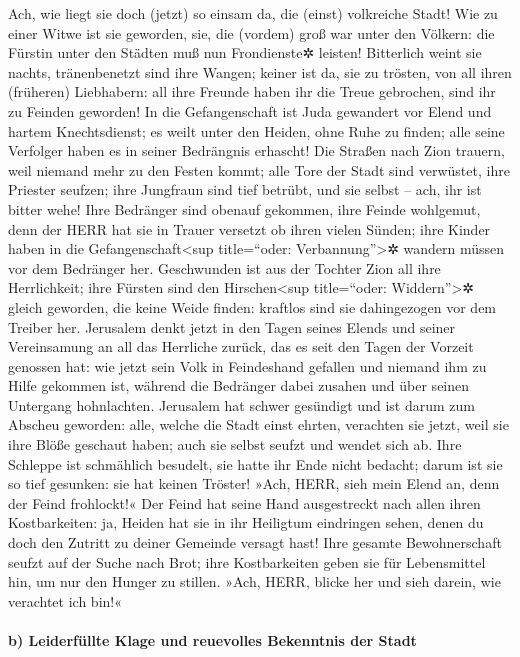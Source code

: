 Ach, wie liegt sie doch (jetzt) so einsam da, die (einst)
volkreiche Stadt! Wie zu einer Witwe ist sie geworden, sie, die (vordem)
groß war unter den Völkern: die Fürstin unter den Städten muß nun
Frondienste✲ leisten! Bitterlich weint sie nachts,
tränenbenetzt sind ihre Wangen; keiner ist da, sie zu trösten, von all
ihren (früheren) Liebhabern: all ihre Freunde haben ihr die Treue
gebrochen, sind ihr zu Feinden geworden! In die
Gefangenschaft ist Juda gewandert vor Elend und hartem Knechtsdienst; es
weilt unter den Heiden, ohne Ruhe zu finden; alle seine Verfolger haben
es in seiner Bedrängnis erhascht! Die Straßen nach Zion
trauern, weil niemand mehr zu den Festen kommt; alle Tore der Stadt sind
verwüstet, ihre Priester seufzen; ihre Jungfraun sind tief betrübt, und
sie selbst -- ach, ihr ist bitter wehe! Ihre Bedränger
sind obenauf gekommen, ihre Feinde wohlgemut, denn der HERR hat sie in
Trauer versetzt ob ihren vielen Sünden; ihre Kinder haben in die
Gefangenschaft\textless sup title=``oder: Verbannung''\textgreater✲
wandern müssen vor dem Bedränger her. Geschwunden ist aus
der Tochter Zion all ihre Herrlichkeit; ihre Fürsten sind den
Hirschen\textless sup title=``oder: Widdern''\textgreater✲ gleich
geworden, die keine Weide finden: kraftlos sind sie dahingezogen vor dem
Treiber her. Jerusalem denkt jetzt in den Tagen seines
Elends und seiner Vereinsamung an all das Herrliche zurück, das es seit
den Tagen der Vorzeit genossen hat: wie jetzt sein Volk in Feindeshand
gefallen und niemand ihm zu Hilfe gekommen ist, während die Bedränger
dabei zusahen und über seinen Untergang hohnlachten.
Jerusalem hat schwer gesündigt und ist darum zum Abscheu
geworden: alle, welche die Stadt einst ehrten, verachten sie jetzt, weil
sie ihre Blöße geschaut haben; auch sie selbst seufzt und wendet sich
ab. Ihre Schleppe ist schmählich besudelt, sie hatte ihr
Ende nicht bedacht; darum ist sie so tief gesunken: sie hat keinen
Tröster! »Ach, HERR, sieh mein Elend an, denn der Feind frohlockt!«
Der Feind hat seine Hand ausgestreckt nach allen ihren
Kostbarkeiten: ja, Heiden hat sie in ihr Heiligtum eindringen sehen,
denen du doch den Zutritt zu deiner Gemeinde versagt hast!
Ihre gesamte Bewohnerschaft seufzt auf der Suche nach
Brot; ihre Kostbarkeiten geben sie für Lebensmittel hin, um nur den
Hunger zu stillen. »Ach, HERR, blicke her und sieh darein, wie verachtet
ich bin!«

\hypertarget{b-leiderfuxfcllte-klage-und-reuevolles-bekenntnis-der-stadt}{%
\paragraph{b) Leiderfüllte Klage und reuevolles Bekenntnis der
Stadt}\label{b-leiderfuxfcllte-klage-und-reuevolles-bekenntnis-der-stadt}}

